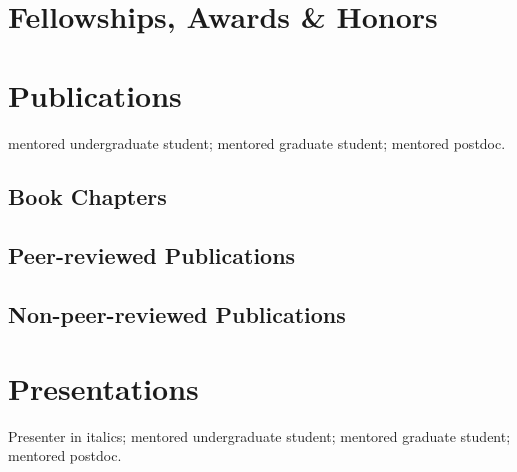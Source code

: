 \section*{Fellowships, Awards \& Honors}


\section*{Publications}
\ugsymbol{}mentored undergraduate student;
\phdsymbol{}mentored graduate student;
\postdocsymbol{}mentored postdoc.


\subsection*{Book Chapters}
\nocite{*}
\printbibliography[filter=bookchapters, heading=none]

\subsection*{Peer-reviewed Publications}
\nocite{*}
\printbibliography[filter=cvpapersnopreprints, heading=none]



\subsection*{Non-peer-reviewed Publications}


\section*{Presentations}
Presenter in italics;
\ugsymbol{}mentored undergraduate student;
\phdsymbol{}mentored graduate student;
\postdocsymbol{}mentored postdoc.

